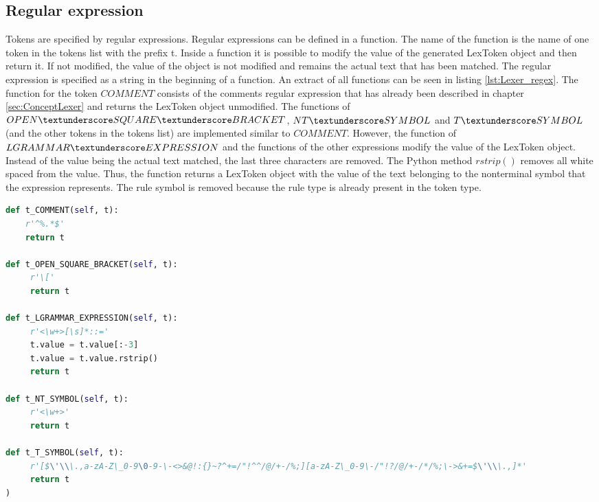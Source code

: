\subsection{Regular expression}\label{sec:ImplementationLexerRegularExpression}

Tokens are specified by regular expressions. Regular expressions can be defined in a function. The name of the function is the name of one token in the tokens list with the prefix t\textunderscore . Inside a function it is possible to modify the value of the generated LexToken object and then return it. If not modified, the value of the object is not modified and remains the actual text that has been matched. The regular expression is specified as a string in the beginning of a function. An extract of all functions can be seen in listing \ref{lst:Lexer_regex}. The function for the token $COMMENT$ consists of the comments regular expression that has already been described in chapter \ref{sec:ConceptLexer} and returns the LexToken object unmodified. The functions of $OPEN\textunderscore SQUARE\textunderscore BRACKET$, $NT\textunderscore SYMBOL$ and $T\textunderscore SYMBOL$ (and the other tokens in the tokens list) are implemented similar to $COMMENT$. However, the function of $LGRAMMAR\textunderscore EXPRESSION$ and the functions of the other expressions modify the value of the LexToken object. Instead of the value being the actual text matched, the last three characters are removed. The Python method $rstrip()$ removes all white spaced from the value. Thus, the function returns a LexToken object with the value of the text belonging to the nonterminal symbol that the expression represents. The rule symbol is removed because the rule type is already present in the token type. \\

\begin{lstlisting}[language=Python,basicstyle=\scriptsize	,caption= Lexer regular expressions,label= lst:Lexer_regex]
def t_COMMENT(self, t):
    r'^%.*$'
    return t

def t_OPEN_SQUARE_BRACKET(self, t):
     r'\['
     return t

def t_LGRAMMAR_EXPRESSION(self, t):
     r'<\w+>[\s]*::='
     t.value = t.value[:-3]
     t.value = t.value.rstrip()
     return t

def t_NT_SYMBOL(self, t):
     r'<\w+>'
     return t

def t_T_SYMBOL(self, t):
     r'[$\'\\\.,a-zA-Z\_0-9\0-9-\-<>&@!:{}~?^+=/"!^^/@/+-/%;][a-zA-Z\_0-9\-/"!?/@/+-/*/%;\->&+=$\'\\\.,]*'
     return t
)
\end{lstlisting}

